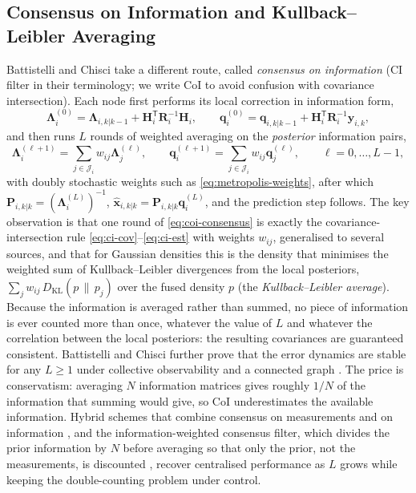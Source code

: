 \subsection{Consensus on Information and Kullback--Leibler Averaging}
\label{subsec:mas-coi}

Battistelli and Chisci \cite{battistelli2014_kl_consensus} take a different route, called \emph{consensus on information} (CI filter in their terminology; we write CoI to avoid confusion with covariance intersection). Each node first performs its local correction in information form,
\begin{equation}
\mathbf{\Lambda}_i^{(0)}=\mathbf{\Lambda}_{i,k|k-1}+\mathbf{H}_i^{\mathsf T}\mathbf{R}_i^{-1}\mathbf{H}_i,\qquad
\mathbf{q}_i^{(0)}=\mathbf{q}_{i,k|k-1}+\mathbf{H}_i^{\mathsf T}\mathbf{R}_i^{-1}\mathbf{y}_{i,k},
\label{eq:coi-local}
\end{equation}
and then runs $L$ rounds of weighted averaging on the \emph{posterior} information pairs,
\begin{equation}
\mathbf{\Lambda}_i^{(\ell+1)}=\sum_{j\in\mathcal{J}_i}w_{ij}\mathbf{\Lambda}_j^{(\ell)},\qquad
\mathbf{q}_i^{(\ell+1)}=\sum_{j\in\mathcal{J}_i}w_{ij}\mathbf{q}_j^{(\ell)},\qquad \ell=0,\dots,L-1,
\label{eq:coi-consensus}
\end{equation}
with doubly stochastic weights such as \eqref{eq:metropolis-weights}, after which $\mathbf{P}_{i,k|k}=(\mathbf{\Lambda}_i^{(L)})^{-1}$, $\widehat{\mathbf{x}}_{i,k|k}=\mathbf{P}_{i,k|k}\mathbf{q}_i^{(L)}$, and the prediction step follows. The key observation is that one round of \eqref{eq:coi-consensus} is exactly the covariance-intersection rule \eqref{eq:ci-cov}--\eqref{eq:ci-est} with weights $w_{ij}$, generalised to several sources, and that for Gaussian densities this is the density that minimises the weighted sum of Kullback--Leibler divergences from the local posteriors, $\sum_{j}w_{ij}\,D_{\mathrm{KL}}(p\,\|\,p_j)$ over the fused density $p$ (the \emph{Kullback--Leibler average}). Because the information is averaged rather than summed, no piece of information is ever counted more than once, whatever the value of $L$ and whatever the correlation between the local posteriors: the resulting covariances are guaranteed consistent. Battistelli and Chisci further prove that the error dynamics are stable for any $L\ge1$ under collective observability and a connected graph \cite{battistelli2014_kl_consensus}. The price is conservatism: averaging $N$ information matrices gives roughly $1/N$ of the information that summing would give, so CoI underestimates the available information. Hybrid schemes that combine consensus on measurements and on information \cite{battistelli2015_cmci}, and the information-weighted consensus filter, which divides the prior information by $N$ before averaging so that only the prior, not the measurements, is discounted \cite{kamal2013_icf}, recover centralised performance as $L$ grows while keeping the double-counting problem under control.

